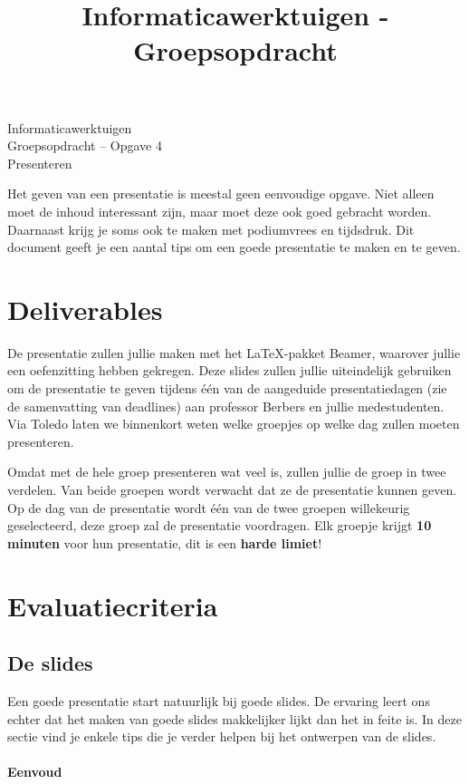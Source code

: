 \documentclass[a4paper]{article}
\title{Informaticawerktuigen - Groepsopdracht}
\begin{document}
\begin{center}
  \huge Informaticawerktuigen \\
  \Huge Groepsopdracht -- Opgave 4 \\
  \huge Presenteren
\end{center}
\vspace{1em}

Het geven van een presentatie is meestal geen eenvoudige opgave.
Niet alleen moet de inhoud interessant zijn, maar moet deze ook goed gebracht worden.
Daarnaast krijg je soms ook te maken met podiumvrees en tijdsdruk.
Dit document geeft je een aantal tips om een goede presentatie te maken en te geven.


\section{Deliverables}

De presentatie zullen jullie maken met het \LaTeX{}-pakket Beamer, waarover jullie een oefenzitting hebben gekregen.
Deze slides zullen jullie uiteindelijk gebruiken om de presentatie te geven tijdens \'e\'en van de aangeduide presentatiedagen (zie de samenvatting van deadlines) aan professor Berbers en jullie medestudenten.
Via Toledo laten we binnenkort weten welke groepjes op welke dag zullen moeten presenteren.

Omdat met de hele groep presenteren wat veel is, zullen jullie de groep in twee verdelen.
Van beide groepen wordt verwacht dat ze de presentatie kunnen geven.
Op de dag van de presentatie wordt \'e\'en van de twee groepen willekeurig geselecteerd, deze groep zal de presentatie voordragen.
Elk groepje krijgt \textbf{10 minuten} voor hun presentatie, dit is een \textbf{harde limiet}!


\section{Evaluatiecriteria}

\subsection{De slides}

Een goede presentatie start natuurlijk bij goede slides.
De ervaring leert ons echter dat het maken van goede slides makkelijker lijkt dan het in feite is.
In deze sectie vind je enkele tips die je verder helpen bij het ontwerpen van de slides.


\paragraph{Eenvoud}
\end{document}
